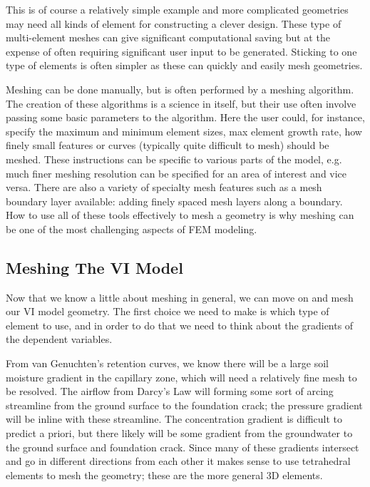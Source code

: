 This is of course a relatively simple example and more complicated geometries may need all kinds of element for constructing a clever design.
These type of multi-element meshes can give significant computational saving but at the expense of often requiring significant user input to be generated.
Sticking to one type of elements is often simpler as these can quickly and easily mesh geometries.\par

Meshing can be done manually, but is often performed by a meshing algorithm.
The creation of these algorithms is a science in itself, but their use often involve passing some basic parameters to the algorithm.
Here the user could, for instance, specify the maximum and minimum element sizes, max element growth rate, how finely small features or curves (typically quite difficult to mesh) should be meshed.
These instructions can be specific to various parts of the model, e.g. much finer meshing resolution can be specified for an area of interest and vice versa.
There are also a variety of specialty mesh features such as a mesh boundary layer available: adding finely spaced mesh layers along a boundary.
How to use all of these tools effectively to mesh a geometry is why meshing can be one of the most challenging aspects of FEM modeling.\par

\subsection{Meshing The VI Model}

Now that we know a little about meshing in general, we can move on and mesh our VI model geometry.
The first choice we need to make is which type of element to use, and in order to do that we need to think about the gradients of the dependent variables.\par

From van Genuchten's retention curves, we know there will be a large soil moisture gradient in the capillary zone, which will need a relatively fine mesh to be resolved.
The airflow from Darcy's Law will forming some sort of arcing streamline from the ground surface to the foundation crack; the pressure gradient will be inline with these streamline.
The concentration gradient is difficult to predict a priori, but there likely will be some gradient from the groundwater to the ground surface and foundation crack.
Since many of these gradients intersect and go in different directions from each other it makes sense to use tetrahedral elements to mesh the geometry; these are the more general 3D elements.\par

